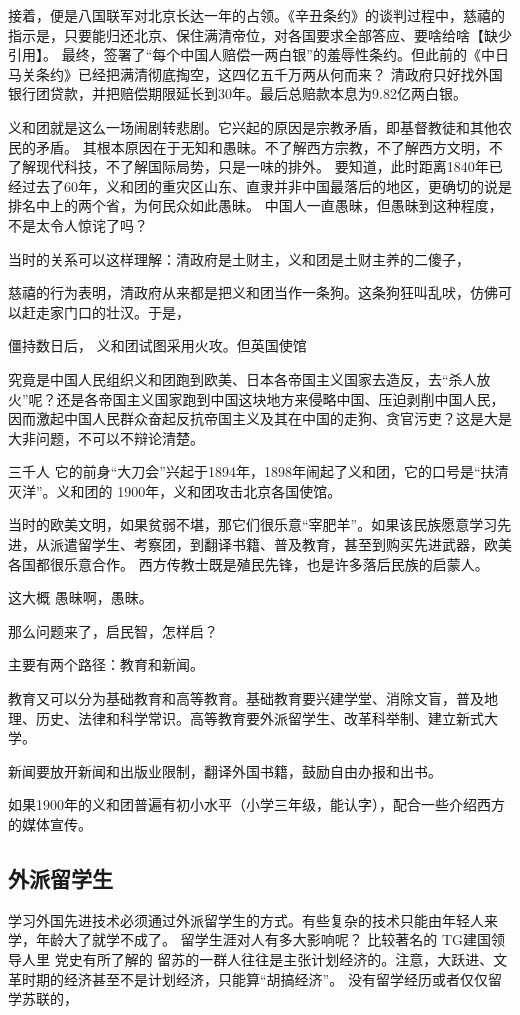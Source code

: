 接着，便是八国联军对北京长达一年的占领。《辛丑条约》的谈判过程中，慈禧的指示是，只要能归还北京、保住满清帝位，对各国要求全部答应、要啥给啥【缺少引用】。
最终，签署了“每个中国人赔偿一两白银”的羞辱性条约。但此前的《中日马关条约》已经把满清彻底掏空，这四亿五千万两从何而来？
清政府只好找外国银行团贷款，并把赔偿期限延长到30年。最后总赔款本息为9.82亿两白银。

义和团就是这么一场闹剧转悲剧。它兴起的原因是宗教矛盾，即基督教徒和其他农民的矛盾。
其根本原因在于无知和愚昧。不了解西方宗教，不了解西方文明，不了解现代科技，不了解国际局势，只是一味的排外。
要知道，此时距离1840年已经过去了60年，义和团的重灾区山东、直隶并非中国最落后的地区，更确切的说是排名中上的两个省，为何民众如此愚昧。
中国人一直愚昧，但愚昧到这种程度，不是太令人惊诧了吗？


当时的关系可以这样理解：清政府是土财主，义和团是土财主养的二傻子，

慈禧的行为表明，清政府从来都是把义和团当作一条狗。这条狗狂叫乱吠，仿佛可以赶走家门口的壮汉。于是，

僵持数日后，
义和团试图采用火攻。但英国使馆

究竟是中国人民组织义和团跑到欧美、日本各帝国主义国家去造反，去“杀人放火”呢？还是各帝国主义国家跑到中国这块地方来侵略中国、压迫剥削中国人民，因而激起中国人民群众奋起反抗帝国主义及其在中国的走狗、贪官污吏？这是大是大非问题，不可以不辩论清楚。 

三千人
它的前身“大刀会”兴起于1894年，1898年闹起了义和团，它的口号是“扶清灭洋”。义和团的
1900年，义和团攻击北京各国使馆。

当时的欧美文明，如果贫弱不堪，那它们很乐意“宰肥羊”。如果该民族愿意学习先进，从派遣留学生、考察团，到翻译书籍、普及教育，甚至到购买先进武器，欧美各国都很乐意合作。
西方传教士既是殖民先锋，也是许多落后民族的启蒙人。



这大概
愚昧啊，愚昧。

那么问题来了，启民智，怎样启？

主要有两个路径：教育和新闻。

教育又可以分为基础教育和高等教育。基础教育要兴建学堂、消除文盲，普及地理、历史、法律和科学常识。高等教育要外派留学生、改革科举制、建立新式大学。

新闻要放开新闻和出版业限制，翻译外国书籍，鼓励自由办报和出书。

如果1900年的义和团普遍有初小水平（小学三年级，能认字），配合一些介绍西方的媒体宣传。

\subsection{外派留学生}
学习外国先进技术必须通过外派留学生的方式。有些复杂的技术只能由年轻人来学，年龄大了就学不成了。
	留学生涯对人有多大影响呢？
	比较著名的
TG建国领导人里
党史有所了解的
留苏的一群人往往是主张计划经济的。注意，大跃进、文革时期的经济甚至不是计划经济，只能算“胡搞经济”。
没有留学经历或者仅仅留学苏联的，

